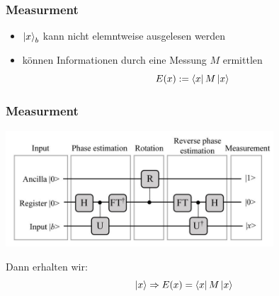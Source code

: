\begin{frame}
    \frametitle{Measurment}
    
    \begin{itemize}
        \item $\ket{x}_b$ kann nicht elemntweise ausgelesen werden
        \item können Informationen durch eine Messung $M$ ermittlen
        $$ E(x) := \bra{x}M\ket{x} $$

    \end{itemize}
\end{frame}

\begin{frame}
    \frametitle{Measurment}
    \begin{center}
    \includegraphics[width=10cm]{img/hhl_circuit.jpg}
    \end{center}

    
    Dann erhalten wir:
        $$\ket{x} \Rightarrow E(x) = \bra{x}M\ket{x} $$


\end{frame}
